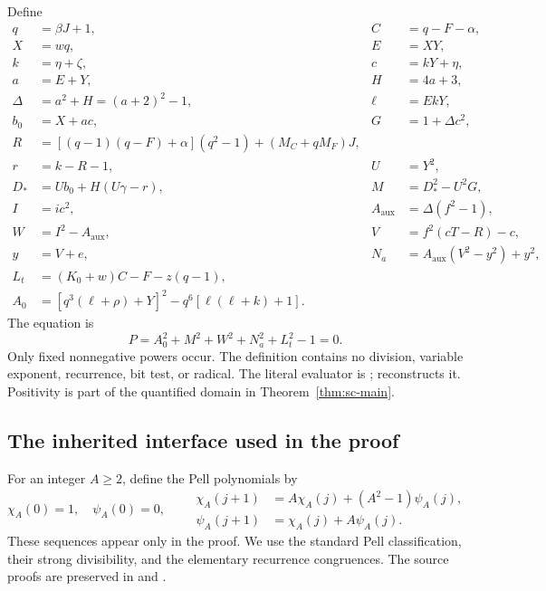 Define
\begin{equation}\label{eq:sc-registers}
\begin{aligned}
 q&=\beta J+1,                 & C&=q-F-\alpha,\\
 X&=wq,                       & E&=XY,\\
 k&=\eta+\zeta,               & c&=kY+\eta,\\
 a&=E+Y,                      & H&=4a+3,\\
 \Delta&=a^2+H=(a+2)^2-1,     & \ell&=EkY,\\
 b_0&=X+ac,                   & G&=1+\Delta c^2,\\
 R&=[(q-1)(q-F)+\alpha](q^2-1)+(M_C+qM_F)J,\\
 r&=k-R-1,                    & U&=Y^2,\\
 D_*&=Ub_0+H(U\gamma-r),       & M&=D_*^2-U^2G,\\
 I&=ic^2,                     & A_{\mathrm{aux}}&=\Delta(f^2-1),\\
 W&=I^2-A_{\mathrm{aux}},      & V&=f^2(cT-R)-c,\\
 y&=V+e,                      & N_a&=A_{\mathrm{aux}}(V^2-y^2)+y^2,\\
 L_t&=(K_0+w)C-F-z(q-1),\\
 A_0&=[q^3(\ell+\rho)+Y]^2-q^6[\ell(\ell+k)+1].
\end{aligned}
\end{equation}
The equation is
\begin{equation}\label{eq:sc-polynomial}
 \boxed{P=A_0^2+M^2+W^2+N_a^2+L_t^2-1=0.}
\end{equation}
Only fixed nonnegative powers occur.  The definition contains no division,
variable exponent, recurrence, bit test, or radical.  The literal evaluator
is ;  reconstructs it.  Positivity is
part of the quantified domain in Theorem~\ref{thm:sc-main}.

\subsection{The inherited interface used in the proof}

For an integer $A\ge2$, define the Pell polynomials by
\[
 \chi_A(0)=1,\quad\psi_A(0)=0,\qquad
 \begin{aligned}
 \chi_A(j+1)&=A\chi_A(j)+(A^2-1)\psi_A(j),\\
 \psi_A(j+1)&=\chi_A(j)+A\psi_A(j).
 \end{aligned}
\]
These sequences appear only in the proof.  We use the standard Pell
classification, their strong divisibility, and the elementary recurrence
congruences.  The source proofs are preserved in
 and
.

